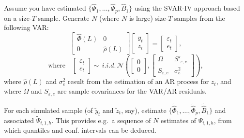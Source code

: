 \documentclass[
  12pt,
]{book}
\theoremstyle{definition}
\theoremstyle{definition}
\theoremstyle{definition}
\theoremstyle{definition}
\theoremstyle{remark}
\begin{document}
Assume you have estimated \(\{\widehat{\Phi}_1,\dots,\widehat{\Phi}_p,\widehat{B}_1\}\) using the SVAR-IV approach based on a size-\(T\) sample. Generate \(N\) (where \(N\) is large) size-\(T\) samples from the following VAR:
\[
\left[
\begin{array}{cc}
\widehat{\Phi}(L) & 0 \\
0 & \widehat{\rho}(L)
\end{array}
\right]
\left[
\begin{array}{c}
y_t \\
z_t
\end{array}
\right] =
\left[
\begin{array}{c}
\varepsilon_t \\
e_t
\end{array}
\right],
\]
\[
\mbox{where} \quad \left[
\begin{array}{c}
\varepsilon_t \\
e_t
\end{array}
\right]\sim \, i.i.d.\,\mathcal{N}\left(\left[\begin{array}{c}0\\0\end{array}\right],
\left[\begin{array}{cc}
\Omega & S'_{\varepsilon,e}\\
S_{\varepsilon,e}& \sigma^2_{e}
\end{array}\right]
\right),
\]
where \(\widehat{\rho}(L)\) and \(\sigma^2_{e}\) result from the estimation of an AR process for \(z_t\), and where \(\Omega\) and \(S_{\varepsilon,e}\) are sample covariances for the VAR/AR residuals.

For each simulated sample (of \(\tilde{y}_t\) and \(\tilde{z}_t\), say), estimate \(\{\widetilde{\widehat{\Phi}}_1,\dots,\widetilde{\widehat{\Phi}}_p,\widetilde{\widehat{B}}_1\}\) and associated \(\widetilde{\Psi}_{i,1,h}\). This provides e.g.~a sequence of \(N\) estimates of \(\Psi_{i,1,h}\), from which quantiles and conf. intervals can be deduced.
\end{document}
